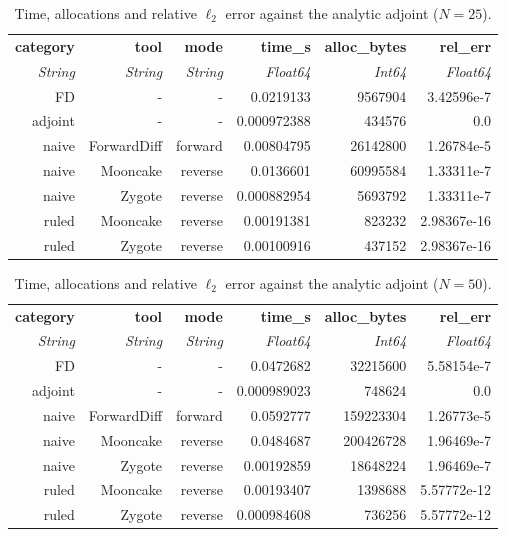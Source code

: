 \begin{table}[H]
  \centering
  \caption{Time, allocations and relative $\ell_2$ error against the analytic adjoint ($N = 25$).}
  \label{tab:scaling-N25}
\begin{tabular}{rrrrrr}
  \toprule
  \textbf{category} & \textbf{tool} & \textbf{mode} & \textbf{time\_s} & \textbf{alloc\_bytes} & \textbf{rel\_err} \\
  \textit{String} & \textit{String} & \textit{String} & \textit{Float64} & \textit{Int64} & \textit{Float64} \\
  \midrule
  FD & - & - & 0.0219133 & 9567904 & 3.42596e-7 \\
  adjoint & - & - & 0.000972388 & 434576 & 0.0 \\
  naive & ForwardDiff & forward & 0.00804795 & 26142800 & 1.26784e-5 \\
  naive & Mooncake & reverse & 0.0136601 & 60995584 & 1.33311e-7 \\
  naive & Zygote & reverse & 0.000882954 & 5693792 & 1.33311e-7 \\
  ruled & Mooncake & reverse & 0.00191381 & 823232 & 2.98367e-16 \\
  ruled & Zygote & reverse & 0.00100916 & 437152 & 2.98367e-16 \\
  \bottomrule
\end{tabular}
\end{table}
\begin{table}[H]
  \centering
  \caption{Time, allocations and relative $\ell_2$ error against the analytic adjoint ($N = 50$).}
  \label{tab:scaling-N50}
\begin{tabular}{rrrrrr}
  \toprule
  \textbf{category} & \textbf{tool} & \textbf{mode} & \textbf{time\_s} & \textbf{alloc\_bytes} & \textbf{rel\_err} \\
  \textit{String} & \textit{String} & \textit{String} & \textit{Float64} & \textit{Int64} & \textit{Float64} \\
  \midrule
  FD & - & - & 0.0472682 & 32215600 & 5.58154e-7 \\
  adjoint & - & - & 0.000989023 & 748624 & 0.0 \\
  naive & ForwardDiff & forward & 0.0592777 & 159223304 & 1.26773e-5 \\
  naive & Mooncake & reverse & 0.0484687 & 200426728 & 1.96469e-7 \\
  naive & Zygote & reverse & 0.00192859 & 18648224 & 1.96469e-7 \\
  ruled & Mooncake & reverse & 0.00193407 & 1398688 & 5.57772e-12 \\
  ruled & Zygote & reverse & 0.000984608 & 736256 & 5.57772e-12 \\
  \bottomrule
\end{tabular}
\end{table}
